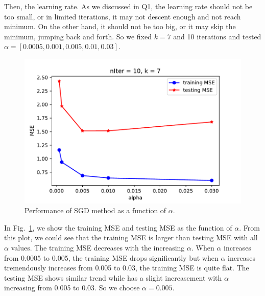\documentclass[twoside,11pt]{homework}
\begin{document}
Then, the learning rate.
As we discussed in Q1, the learning rate should not be too small, or in limited iterations, it may not descent enough and not reach minimum.
On the other hand, it should not be too big, or it may skip the minimum, jumping back and forth.
So we fixed $k = 7$ and 10 iterations and tested $\alpha = [0.0005, 0.001, 0.005, 0.01, 0.03]$.
%
\begin{figure}[ht]
\centering
\includegraphics[]{alphaTest.pdf}
\caption{Performance of SGD method as a function of $\alpha$.}
\label{Falpha}
\end{figure}
%
In Fig.~\ref{Falpha}, we show the training MSE and testing MSE as the function of $\alpha$.
From this plot, we could see that the training MSE is larger than testing MSE with all $\alpha$ values.
The training MSE decreases with the increasing $\alpha$.
When $\alpha$ increases from 0.0005 to 0.005, the training MSE drops significantly but when  $\alpha$ increases tremendously increases from 0.005 to 0.03, the training MSE is quite flat.
The testing MSE shows similar trend while has a slight increasement with $\alpha$ increasing from 0.005 to 0.03.
So we choose $\alpha = 0.005$.
\end{document}
